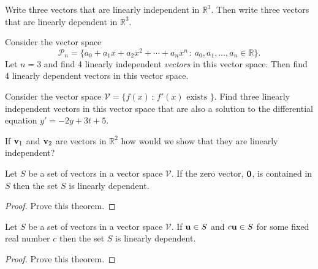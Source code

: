 \begin{problem}
    Write three vectors that are linearly independent in $\mathbb{R}^3$.  Then write
    three vectors that are linearly dependent in $\mathbb{R}^3$. 
\end{problem}

\begin{problem}
    Consider the vector space 
    \[ \mathcal{P}_n = \{ a_0 + a_1 x + a_2 x^2 + \cdots + a_n x^n \,
    : \, a_0, a_1, \dots, a_n \in \mathbb{R} \}. \]
    Let $n=3$ and find 4 linearly
        independent {\it vectors} in this vector space.  Then find 4 linearly dependent
        vectors in this vector space.
\end{problem}

\begin{problem}
    Consider the vector space $\mathcal{V} = \{ f(x) \, : \, f'(x) \text{ exists } \}$.
    Find three linearly independent vectors in this vector space that are also a solution
    to the differential equation $y' = -2y + 3t + 5$.
\end{problem}
\solution{
    \[ \{ e^{2t}, t, 1 \} \]
}

\begin{problem}
    If ${\bf v}_1$ and ${\bf v}_2$ are vectors in $\mathbb{R}^2$ how would we show that they are
    linearly independent?
\end{problem}

\begin{thm}
    Let $S$ be a set of vectors in a vector space $\mathcal{V}$.  If the zero vector,
    ${\bf 0}$, is contained in $S$ then the set $S$ is linearly dependent.
\end{thm}
\begin{proof}
    Prove this theorem.
\end{proof}


\begin{thm}
    Let $S$ be a set of vectors in a vector space $\mathcal{V}$.  If ${\bf u} \in S$
    and $c{\bf u} \in S$ for some fixed real number $c$ then the set $S$ is linearly
    dependent.
\end{thm}
\begin{proof}
    Prove this theorem.
\end{proof}

